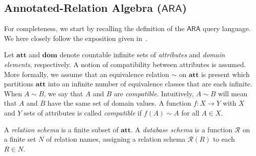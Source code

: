 \newcommand{\MLm}{\mathsf{MATLANG}}
\newcommand{\ML}{$\MLm$\xspace}
\newcommand{\ARAm}{\mathsf{ARA}}
\newcommand{\ARA}{$\ARAm$\xspace}
\newcommand{\ARAC}{$(\ARAm+\zeta_k)(k)$\xspace}
\newcommand{\ARACTWO}{$(\ARAm+\zeta_2)(2)$\xspace}
\newcommand{\Rel}{\mathrm{Rel}}
\newcommand{\Mat}{\mathrm{Mat}}


%
%
%
%
\subsection{Annotated-Relation Algebra (\ARA)} 
For completeness, we start by recalling the definition of the \ARA query language. We  here closely follow the exposition given in~\cite{brijder2019matrices}.

Let $\mathbf{att}$ and $\mathbf{dom}$ denote countable infinite sets of  \emph{attributes} and \emph{domain elements}, respectively. A notion of compatibility between attributes is assumed. More formally,
we assume that an equivalence relation $\sim$ on $\mathbf{att}$ is present which partitions $\mathbf{att}$ into an infinite number of equivalence classes that are each infinite. When $A \sim B$, we say that $A$ and $B$ are \emph{compatible}. Intuitively, $A \sim B$ will mean that $A$ and $B$ have the same set of domain values. A function $f: X \to Y$ with $X$ and $Y$ sets of attributes is called \emph{compatible} if $f(A) \sim A$ for all $A \in X$.

A \emph{relation schema} is a finite subset of $\mathbf{att}$. A \emph{database schema} is a function $\mathcal{R}$ on a finite set $N$ of relation names, assigning a relation schema $\mathcal{R}(R)$ to each $R \in N$.

